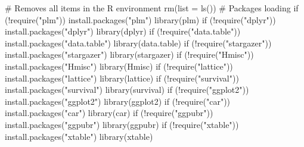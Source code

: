 \documentclass[12pt,]{article}
\newenvironment{Shaded}{}{}
\newcommand{\KeywordTok}[1]{\textcolor[rgb]{0.00,0.00,1.00}{#1}}
\newcommand{\DataTypeTok}[1]{#1}
\newcommand{\StringTok}[1]{\textcolor[rgb]{0.00,0.50,0.50}{#1}}
\newcommand{\CommentTok}[1]{\textcolor[rgb]{0.00,0.50,0.00}{#1}}
\newcommand{\ControlFlowTok}[1]{\textcolor[rgb]{0.00,0.00,1.00}{#1}}
\newcommand{\OperatorTok}[1]{#1}
\newcommand{\NormalTok}[1]{#1}
\begin{document}
\begin{Shaded}
\begin{Highlighting}[]
\CommentTok{# Removes all items in the R environment}
\KeywordTok{rm}\NormalTok{(}\DataTypeTok{list =} \KeywordTok{ls}\NormalTok{())}
\CommentTok{# Packages loading}
\ControlFlowTok{if}\NormalTok{ (}\OperatorTok{!}\KeywordTok{require}\NormalTok{(}\StringTok{"plm"}\NormalTok{)) }\KeywordTok{install.packages}\NormalTok{(}\StringTok{"plm"}\NormalTok{)}
\KeywordTok{library}\NormalTok{(plm)}
\ControlFlowTok{if}\NormalTok{ (}\OperatorTok{!}\KeywordTok{require}\NormalTok{(}\StringTok{"dplyr"}\NormalTok{)) }\KeywordTok{install.packages}\NormalTok{(}\StringTok{"dplyr"}\NormalTok{)}
\KeywordTok{library}\NormalTok{(dplyr)}
\ControlFlowTok{if}\NormalTok{ (}\OperatorTok{!}\KeywordTok{require}\NormalTok{(}\StringTok{"data.table"}\NormalTok{)) }\KeywordTok{install.packages}\NormalTok{(}\StringTok{"data.table"}\NormalTok{)}
\KeywordTok{library}\NormalTok{(data.table)}
\ControlFlowTok{if}\NormalTok{ (}\OperatorTok{!}\KeywordTok{require}\NormalTok{(}\StringTok{"stargazer"}\NormalTok{)) }\KeywordTok{install.packages}\NormalTok{(}\StringTok{"stargazer"}\NormalTok{)}
\KeywordTok{library}\NormalTok{(stargazer)}
\ControlFlowTok{if}\NormalTok{ (}\OperatorTok{!}\KeywordTok{require}\NormalTok{(}\StringTok{"Hmisc"}\NormalTok{)) }\KeywordTok{install.packages}\NormalTok{(}\StringTok{"Hmisc"}\NormalTok{)}
\KeywordTok{library}\NormalTok{(Hmisc)}
\ControlFlowTok{if}\NormalTok{ (}\OperatorTok{!}\KeywordTok{require}\NormalTok{(}\StringTok{"lattice"}\NormalTok{)) }\KeywordTok{install.packages}\NormalTok{(}\StringTok{"lattice"}\NormalTok{)}
\KeywordTok{library}\NormalTok{(lattice)}
\ControlFlowTok{if}\NormalTok{ (}\OperatorTok{!}\KeywordTok{require}\NormalTok{(}\StringTok{"survival"}\NormalTok{)) }\KeywordTok{install.packages}\NormalTok{(}\StringTok{"survival"}\NormalTok{)}
\KeywordTok{library}\NormalTok{(survival)}
\ControlFlowTok{if}\NormalTok{ (}\OperatorTok{!}\KeywordTok{require}\NormalTok{(}\StringTok{"ggplot2"}\NormalTok{)) }\KeywordTok{install.packages}\NormalTok{(}\StringTok{"ggplot2"}\NormalTok{)}
\KeywordTok{library}\NormalTok{(ggplot2)}
\ControlFlowTok{if}\NormalTok{ (}\OperatorTok{!}\KeywordTok{require}\NormalTok{(}\StringTok{"car"}\NormalTok{)) }\KeywordTok{install.packages}\NormalTok{(}\StringTok{"car"}\NormalTok{)}
\KeywordTok{library}\NormalTok{(car)}
\ControlFlowTok{if}\NormalTok{ (}\OperatorTok{!}\KeywordTok{require}\NormalTok{(}\StringTok{"ggpubr"}\NormalTok{)) }\KeywordTok{install.packages}\NormalTok{(}\StringTok{"ggpubr"}\NormalTok{)}
\KeywordTok{library}\NormalTok{(ggpubr)}
\ControlFlowTok{if}\NormalTok{ (}\OperatorTok{!}\KeywordTok{require}\NormalTok{(}\StringTok{"xtable"}\NormalTok{)) }\KeywordTok{install.packages}\NormalTok{(}\StringTok{"xtable"}\NormalTok{)}
\KeywordTok{library}\NormalTok{(xtable)}
\end{Highlighting}
\end{Shaded}
\end{document}

